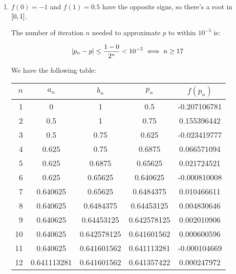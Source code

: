\documentclass[../../Assignments.tex]{subfiles}
\begin{document}
\begin{solution}
    \begin{enumerate}[label=(\alph*)]
        \item \(f(0) = -1\) and \(f(1) = \num{0.5}\) have the opposite signs, so
            there's a root in \(\interval{0}{1}\).

            The number of iteration \(n\) needed to approximate \(p\) to within
            \(10^{-5}\) is:

            \[\abs{p_n - p} \leq \frac{1 - 0}{2^n} < 10^{-5} \iff n \geq 17\]

            We have the following table:

            \begin{longtable}{r S[table-format=1.9] S[table-format=1.9] S[table-format=1.9] S[table-format=-1.9]}
                \toprule
                \(n\)  &   {\(a_n\)}   &   {\(b_n\)}   &   {\(p_n\)}   &  {\(f(p_n)\)}  \\
                  &  0            &  1            &  0.5          &  -0.207106781  \\
                    2  &  0.5          &  1            &  0.75         &   0.155396442  \\
                    3  &  0.5          &  0.75         &  0.625        &  -0.023419777  \\
                    4  &  0.625        &  0.75         &  0.6875       &   0.066571094  \\
                    5  &  0.625        &  0.6875       &  0.65625      &   0.021724521  \\
                    6  &  0.625        &  0.65625      &  0.640625     &  -0.000810008  \\
                    7  &  0.640625     &  0.65625      &  0.6484375    &   0.010466611  \\
                    8  &  0.640625     &  0.6484375    &  0.64453125   &   0.004830646  \\
                    9  &  0.640625     &  0.64453125   &  0.642578125  &   0.002010906  \\
                   10  &  0.640625     &  0.642578125  &  0.641601562  &   0.000600596  \\
                   11  &  0.640625     &  0.641601562  &  0.641113281  &  -0.000104669  \\
                   12  &  0.641113281  &  0.641601562  &  0.641357422  &   0.000247972  \\

\end{longtable}
\end{enumerate}
\end{solution}
\end{document}
